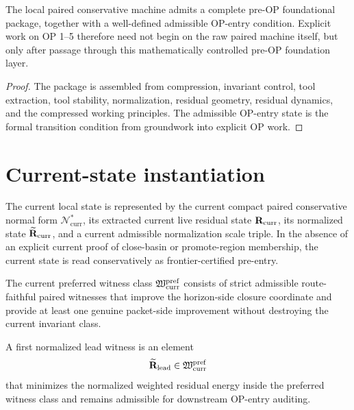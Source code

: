 \begin{theorem}\label{thm:pre-op-foundation-synthesis}
The local paired conservative machine admits a complete pre-OP foundational package, together with a well-defined admissible OP-entry condition. Explicit work on OP 1--5 therefore need not begin on the raw paired machine itself, but only after passage through this mathematically controlled pre-OP foundation layer.
\end{theorem}

\begin{proof}
The package is assembled from compression, invariant control, tool extraction, tool stability, normalization, residual geometry, residual dynamics, and the compressed working principles. The admissible OP-entry state is the formal transition condition from groundwork into explicit OP work.
\end{proof}

\section{Current-state instantiation}
\begin{definition}\label{def:current-frontier-preentry}
The current local state is represented by the current compact paired conservative normal form $\mathcal{N}^{\ast}_{\mathrm{curr}}$, its extracted current live residual state $\mathbf{R}_{\mathrm{curr}}$, its normalized state $\widetilde{\mathbf{R}}_{\mathrm{curr}}$, and a current admissible normalization scale triple. In the absence of an explicit current proof of close-basin or promote-region membership, the current state is read conservatively as frontier-certified pre-entry.
\end{definition}

\begin{definition}\label{def:preferred-witness-class}
The current preferred witness class $\mathfrak{W}^{\mathrm{pref}}_{\mathrm{curr}}$ consists of strict admissible route-faithful paired witnesses that improve the horizon-side closure coordinate and provide at least one genuine packet-side improvement without destroying the current invariant class.
\end{definition}

\begin{definition}\label{def:first-normalized-lead-witness}
A first normalized lead witness is an element
\[
\widetilde{\mathbf{R}}_{\mathrm{lead}}\in\mathfrak{W}^{\mathrm{pref}}_{\mathrm{curr}}
\]
that minimizes the normalized weighted residual energy inside the preferred witness class and remains admissible for downstream OP-entry auditing.
\end{definition}

